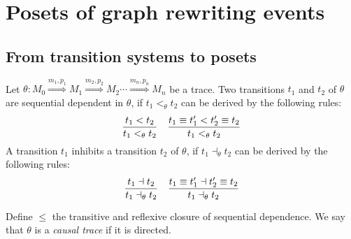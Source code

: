 \section{Posets of graph rewriting events}

\subsection{From transition systems to posets}

\begin{definition}
  Let $\theta:M_0\overset{m_1,p_1}{\Rightarrow} M_1\overset{m_2,p_2}{\Rightarrow} M_2 \cdots \overset{m_n,p_n}{\Rightarrow} M_n$ be a trace.
  Two transitions $t_1$ and $t_2$ of $\theta$ are sequential dependent in $\theta$, if $t_1<_{\theta} t_2$ can be derived by the following rules:
  \begin{align*}
    \frac{t_1 < t_2}{t_1 <_{\theta} t_2}\quad
    \frac{t_1\equiv t_1'<t_2'\equiv t_2}{t_1 <_{\theta} t_2}
  \end{align*}
  A transition $t_1$ inhibits a transition $t_2$ of $\theta$, if $t_1\dashv_{\theta} t_2$ can be derived by the following rules:
  \begin{align*}
    \frac{t_1 \dashv t_2}{t_1 \dashv_{\theta} t_2}\quad
    \frac{t_1\equiv t_1'\dashv t_2'\equiv t_2}{t_1 \dashv_{\theta} t_2}
  \end{align*}

  Define $\leq$ the transitive and reflexive closure of sequential dependence. We say that $\theta$ is a \emph{causal trace} if it is directed.
\end{definition}

